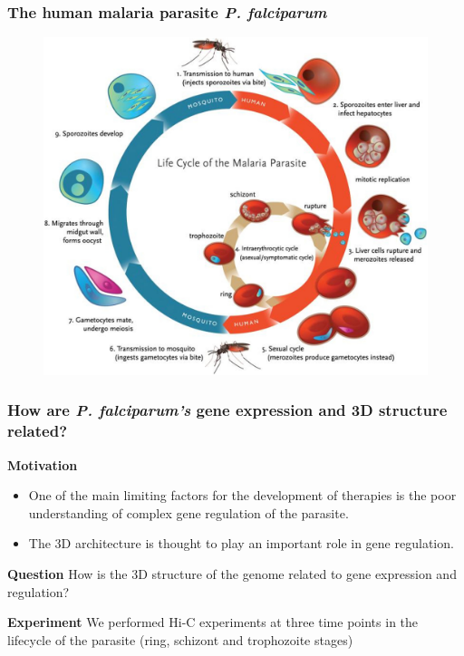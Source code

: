\documentclass[xcolor=dvipsnames]{beamer}
\begin{document}
\begin{frame}
\frametitle{The human malaria parasite {\em P. falciparum}}

\begin{figure}
\includegraphics[width=0.75\linewidth]{figures/plasmodium_lifecycle.jpg}
\end{figure}
\end{frame}

\begin{frame}
\frametitle{How are {\em P. falciparum's} gene expression and 3D structure related?}
{\color{Blue} \textbf{Motivation}}
\begin{itemize}[label={$\bullet$}]

\item One of the main limiting factors for the
development of therapies is the poor understanding of complex gene regulation
of the parasite.
\item The 3D architecture is thought to play an important role in gene
regulation.
\end{itemize}

\vspace{1em}
{\color{Blue} \textbf{Question}} How is the 3D structure of the genome related
to gene expression and regulation?

\vspace{1em}
{\color{Blue} \textbf{Experiment}} We performed Hi-C experiments at three time
points in the lifecycle of the parasite (ring, schizont and trophozoite
stages)

\end{frame}
\end{document}
